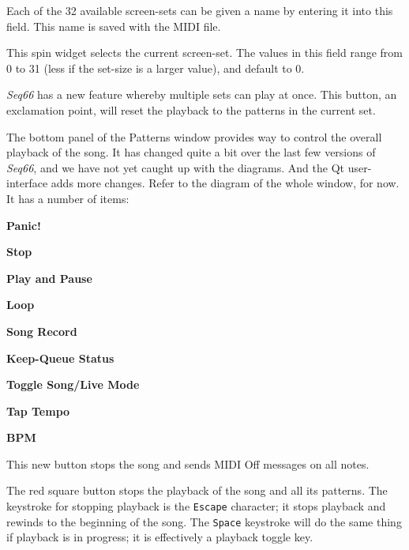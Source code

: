    \setcounter{ItemCounter}{0}      %

   Each of the 32 available screen-sets can be given a name by entering it
   into this field.  This name is saved with the MIDI file.

   This spin widget selects the current screen-set.  The values in this
   field range from 0 to 31 (less if the set-size is a larger value),
   and default to 0.

   \textsl{Seq66} has a new feature whereby multiple sets can play at once.
   This button, an exclamation point, will reset the playback to the patterns
   in the current set.

   The bottom panel of the Patterns window provides way to control the
   overall playback of the song.  It has changed quite a bit over the last few
   versions of \textsl{Seq66}, and we have not yet caught up with the
   diagrams. And the Qt user-interface adds more changes.
   Refer to the diagram of the whole window, for now.
   It has a number of items:

   \begin{enumber}
      \item \textbf{Panic!}
      \item \textbf{Stop}
      \item \textbf{Play and Pause}
      \item \textbf{Loop}
      \item \textbf{Song Record}
      \item \textbf{Keep-Queue Status}
      \item \textbf{Toggle Song/Live Mode}
      \item \textbf{Tap Tempo}
      \item \textbf{BPM}
   \end{enumber}

   \setcounter{ItemCounter}{0}      %

   This new button stops the song and sends MIDI Off messages on all notes.

   The red square button stops the playback of the song and all its patterns.
   The keystroke for stopping playback is the \texttt{Escape} character; it
   stops playback and rewinds to the beginning of the song.
   The \texttt{Space} keystroke will do the same thing if playback is in
   progress; it is effectively a playback toggle key.

